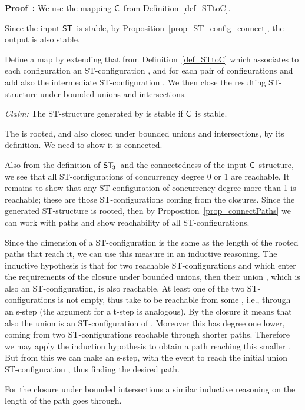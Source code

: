 \documentclass[submission,copyright,creativecommons]{eptcs}
\newenvironment{proof}[1][\!\!\,]{\vspace{1ex}\noindent\textbf{Proof #1: }}{\hfill\vspace{2ex}}
\newcommand\C{\ensuremath{\mathsf{C}}}
\newcommand\ST{\ensuremath{\mathsf{ST}}}
\newcommand\cintostThird{\ensuremath{\mathsf{ST}_{\hspace{-0.4ex}3}}}
\newcommand\stintoc{\ensuremath{\mathsf{C}}}
\begin{document}
\begin{proof}
We use the mapping \stintoc\ from Definition~\ref{def_STtoC}.

Since the input \ST\ is stable, by Proposition~\ref{prop_ST_config_connect}, the output  is also stable.

Define a map  by extending that from Definition~\ref{def_STtoC} which associates to each configuration  an ST-configuration , and for each pair of configurations  and  add also the intermediate ST-configuration . 
We then close the resulting ST-structure under bounded unions and intersections.


\vspace{1ex}
\noindent\textit{Claim:}\hspace{1ex} The ST-structure generated by  is stable if \C\ is stable.
\vspace{0.5ex}

The  is rooted, and also closed under bounded unions and intersections, by its definition. We need to show it is connected.

Also from the definition of \cintostThird\ and the connectedness of the input \C\ structure, we see that all ST-configurations of concurrency degree 0 or 1 are reachable. It remains to show that any ST-configuration of concurrency degree more than 1 is reachable; these are those ST-configurations coming from the closures. Since the generated ST-structure is rooted, then by Proposition~\ref{prop_connectPaths} we can work with paths and show reachability of all ST-configurations.

Since the dimension of a ST-configuration is the same as the length of the rooted paths that reach it, we can use this measure in an inductive reasoning. The inductive hypothesis is that for two reachable ST-configurations  and  which enter the requirements of the closure under bounded unions, then their union , which is also an ST-configuration, is also reachable.
At least one of the two ST-configurations is not empty, thus take  to be reachable from some , i.e., through an s-step (the argument for a t-step is analogous). By the closure it means that also the union  is an ST-configuration of . Moreover this has degree one lower, coming from two ST-configurations reachable through shorter paths. Therefore we may apply the induction hypothesis to obtain a path reaching this smaller . But from this we can make an s-step, with the event  to reach the initial union ST-configuration , thus finding the desired path.

For the closure under bounded intersections a similar inductive reasoning on the length of the path goes through.



\end{proof}
\end{document}
